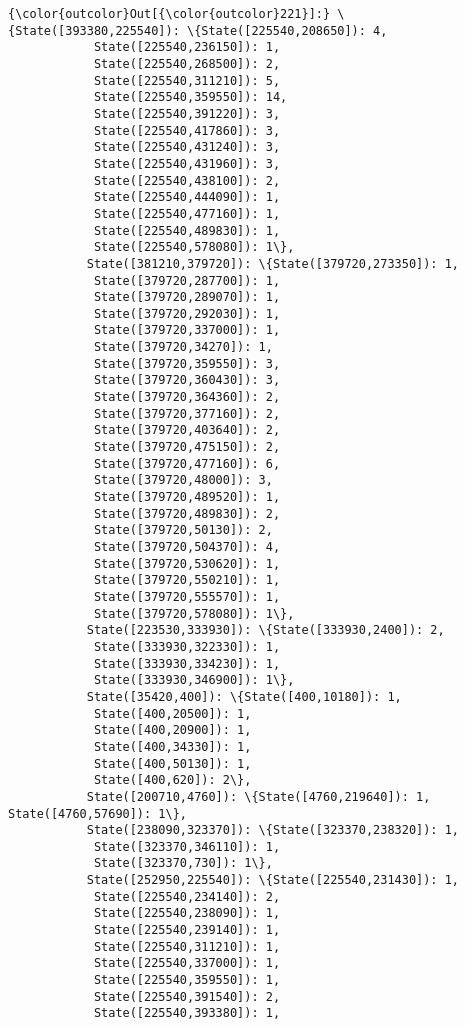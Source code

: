 \documentclass[11pt]{article}
\begin{document}
\begin{Verbatim}[commandchars=\\\{\}]
{\color{outcolor}Out[{\color{outcolor}221}]:} \{State([393380,225540]): \{State([225540,208650]): 4,
            State([225540,236150]): 1,
            State([225540,268500]): 2,
            State([225540,311210]): 5,
            State([225540,359550]): 14,
            State([225540,391220]): 3,
            State([225540,417860]): 3,
            State([225540,431240]): 3,
            State([225540,431960]): 3,
            State([225540,438100]): 2,
            State([225540,444090]): 1,
            State([225540,477160]): 1,
            State([225540,489830]): 1,
            State([225540,578080]): 1\},
           State([381210,379720]): \{State([379720,273350]): 1,
            State([379720,287700]): 1,
            State([379720,289070]): 1,
            State([379720,292030]): 1,
            State([379720,337000]): 1,
            State([379720,34270]): 1,
            State([379720,359550]): 3,
            State([379720,360430]): 3,
            State([379720,364360]): 2,
            State([379720,377160]): 2,
            State([379720,403640]): 2,
            State([379720,475150]): 2,
            State([379720,477160]): 6,
            State([379720,48000]): 3,
            State([379720,489520]): 1,
            State([379720,489830]): 2,
            State([379720,50130]): 2,
            State([379720,504370]): 4,
            State([379720,530620]): 1,
            State([379720,550210]): 1,
            State([379720,555570]): 1,
            State([379720,578080]): 1\},
           State([223530,333930]): \{State([333930,2400]): 2,
            State([333930,322330]): 1,
            State([333930,334230]): 1,
            State([333930,346900]): 1\},
           State([35420,400]): \{State([400,10180]): 1,
            State([400,20500]): 1,
            State([400,20900]): 1,
            State([400,34330]): 1,
            State([400,50130]): 1,
            State([400,620]): 2\},
           State([200710,4760]): \{State([4760,219640]): 1, State([4760,57690]): 1\},
           State([238090,323370]): \{State([323370,238320]): 1,
            State([323370,346110]): 1,
            State([323370,730]): 1\},
           State([252950,225540]): \{State([225540,231430]): 1,
            State([225540,234140]): 2,
            State([225540,238090]): 1,
            State([225540,239140]): 1,
            State([225540,311210]): 1,
            State([225540,337000]): 1,
            State([225540,359550]): 1,
            State([225540,391540]): 2,
            State([225540,393380]): 1,

\end{Verbatim}
\end{document}
